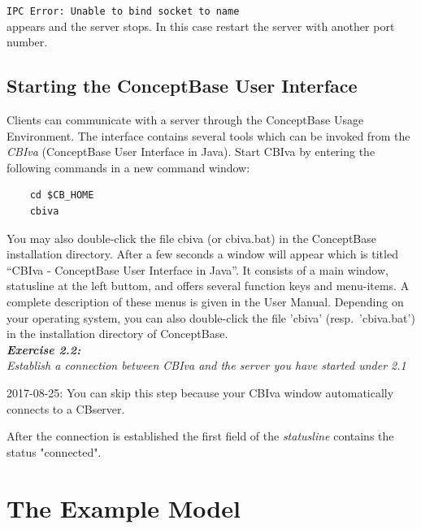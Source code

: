 \documentclass[10pt,a4paper]{article}
\begin{document}
{\tt IPC Error: Unable to bind socket to name } \\

appears and the server stops.
In this case restart the server with another port number.

\subsection{Starting the ConceptBase User Interface}

Clients can communicate with a server through the ConceptBase Usage
Environment. The interface contains several tools which can be invoked
from the {\em CBIva\/} (ConceptBase User Interface in Java). Start CBIva
by entering the following commands in a new command window:

\begin{verbatim}
    cd $CB_HOME
    cbiva
\end{verbatim}

You may also double-click the file cbiva (or cbiva.bat) in the ConceptBase installation directory.
After a few seconds a window will appear which
is titled ``CBIva - ConceptBase User Interface in Java''. It consists of a main window, statusline
at the left buttom, and offers several function keys and menu-items.  A complete description of
these menus is given in the User Manual. Depending on your operating system, you can also
double-click the file 'cbiva' (resp.\ 'cbiva.bat') in the installation directory of ConceptBase. \\

\vspace{0.7cm}
{\it
{\bf Exercise 2.2:}\\
Establish a connection between CBIva and
the server you have started under 2.1 \\
}

{\scriptsize
2017-08-25: You can skip this step because your CBIva window automatically
connects to a CBserver.}

After the connection is established
the first field of the {\em statusline} contains the status "connected".

\vspace{0.7cm}





\section{The Example Model}
\end{document}
